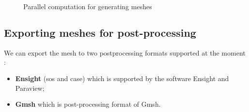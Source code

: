  \begin{figure}[!h]
  \centering
  \caption{Parallel computation for generating meshes}

\end{figure}
  \label{fig:2}



\subsection{Exporting meshes for post-processing}

We can export the mesh to two postprocessing formats supported at the moment :
\begin{itemize}
\item \textbf{Ensight} (sos and case)  which is supported by the software Ensight and Paraview;
\item \textbf{Gmsh} which is post-processing format of Gmsh.
\end{itemize}

